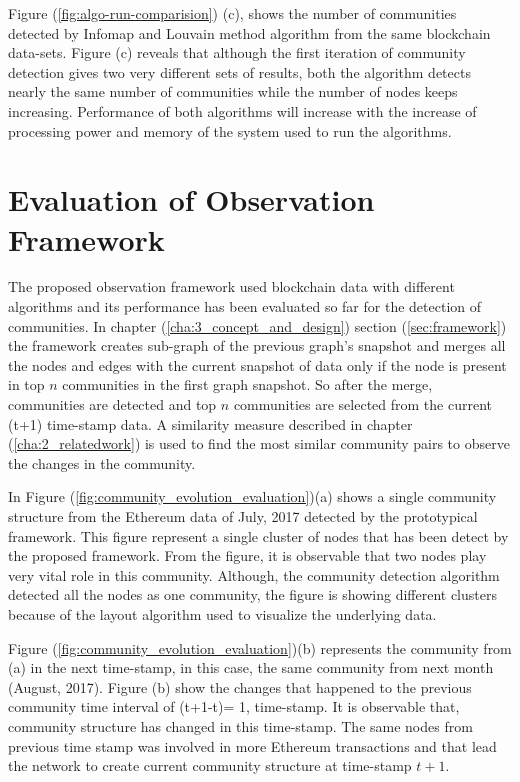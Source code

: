 Figure (\ref{fig:algo-run-comparision}) (c), shows the number of communities detected by Infomap and Louvain method algorithm from the same blockchain data-sets. Figure (c) reveals that although the first iteration of community detection gives two very different sets of results, both the algorithm detects nearly the same number of communities while the number of nodes keeps increasing. Performance of both algorithms will increase with the increase of processing power and memory of the system used to run the algorithms.

\section{Evaluation of Observation Framework}
The proposed observation framework used blockchain data with different algorithms and its performance has been evaluated so far for the detection of communities. In chapter (\ref{cha:3_concept_and_design}) section (\ref{sec:framework}) the framework creates sub-graph of the previous graph's snapshot and merges all the nodes and edges with the current snapshot of data only if the node is present in top $n$ communities in the first graph snapshot. So after the merge, communities are detected and top $n$ communities are selected from the current (t+1) time-stamp data. A similarity measure described in chapter (\ref{cha:2_relatedwork}) is used to find the most similar community pairs to observe the changes in the community.

In Figure (\ref{fig:community_evolution_evaluation})(a) shows a single community structure from the Ethereum data of July, 2017 detected by the prototypical framework. This figure represent a single cluster of nodes that has been detect by the proposed framework. From the figure, it is observable that two nodes play very vital role in this community. Although, the community detection algorithm detected all the nodes as one community, the figure is showing different clusters because of the layout algorithm used to visualize the underlying data.

Figure (\ref{fig:community_evolution_evaluation})(b) represents the community  from (a) in the next time-stamp, in this case, the same community from next month (August, 2017). Figure (b) show the changes that happened to the previous community time interval of (t+1-t)= 1, time-stamp. It is observable that, community structure has changed in this time-stamp. The same nodes from previous time stamp was involved in more Ethereum transactions and that lead the network to create current community structure at time-stamp $t+1$.

